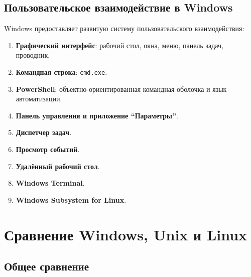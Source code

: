 \documentclass[12pt,a4paper]{article}
\begin{document}
\subsection{Пользовательское взаимодействие в Windows}

Windows предоставляет развитую систему пользовательского взаимодействия:

\begin{enumerate}
    \item \textbf{Графический интерфейс}: рабочий стол, окна, меню, панель задач, проводник.
    \item \textbf{Командная строка}: \texttt{cmd.exe}.
    \item \textbf{PowerShell}: объектно-ориентированная командная оболочка и язык автоматизации.
    \item \textbf{Панель управления и приложение ``Параметры''}.
    \item \textbf{Диспетчер задач}.
    \item \textbf{Просмотр событий}.
    \item \textbf{Удалённый рабочий стол}.
    \item \textbf{Windows Terminal}.
    \item \textbf{Windows Subsystem for Linux}.
\end{enumerate}

\section{Сравнение Windows, Unix и Linux}

\subsection{Общее сравнение}
\end{document}
